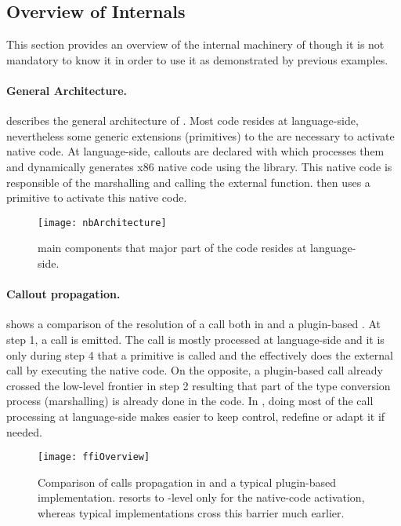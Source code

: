\subsection{Overview of \NBFFI Internals}

This section provides an overview of the internal machinery of \NBFFI though it is not mandatory to know it in order to use it as demonstrated by previous examples.

\paragraph{General Architecture.}
 describes the general architecture of \NB.
Most code resides at language-side, nevertheless some generic extensions (primitives) to the \VM are necessary to activate native code.
At language-side, callouts are declared with \NBFFI which processes them and dynamically generates x86 native code using the  library.
This native code is responsible of the marshalling and calling the external function.
\NB then uses a primitive to activate this native code.

\begin{figure}[ht]
	\centering
	\texttt{[image: nbArchitecture]}
	\caption[\NB Components Layering]{\NB main components that major part of the code resides at language-side.}
\end{figure}

\paragraph{Callout propagation.}
 shows a comparison of the resolution of a \FFI call both in \NBFFI and a plugin-based \FFI.
At step 1, a \FFI call is emitted.
The \NBFFI call is mostly processed at language-side and it is only during step 4 that a primitive is called and the \VM effectively does the external call by executing the native code.
On the opposite, a plugin-based \FFI call already crossed the low-level frontier in step 2 resulting that part of the type conversion process (marshalling) is already done in the \VM code.
In \NBFFI, doing most of the \FFI call processing at language-side makes easier to keep control, redefine or adapt it if needed.

\begin{figure*}[h]
	\begin{adjustwidth}{-2.0in}{-2.0in}
		\centering
		\texttt{[image: ffiOverview]}
	\end{adjustwidth}
	\caption[\FFI Implementation Comparison]{Comparison of \FFI calls propagation in \NBFFI and a typical \VM plugin-based implementation. \NB resorts to \VM-level only for the native-code activation, whereas typical implementations cross this barrier much earlier.}
\end{figure*}
